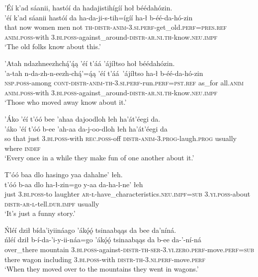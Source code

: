 \newpage
\ea\label{ex:text6-13-21}
’Éí k’ad sáanii, hastóí da hadajistihígíí hoł béédahózin.\\
\gll ’éí	k’ad	sáanii	hastóí	da	ha-da-ji-s-tih=ígíí	ha-ł	b-éé-da-hó-zin\\
     that	now	women	men	not	\textsc{th}-\textsc{distr}-\textsc{anim}-3.\textsc{si}.\textsc{perf}-get\_old.\textsc{perf}=\textsc{pres}.\textsc{ref}	\textsc{anim}.\textsc{poss}-with	3.\textsc{bi}.\textsc{poss}-against\_around-\textsc{distr}-\textsc{ar}.\textsc{ni}.\textsc{th}-know.\textsc{neu}.\textsc{impf}\\
\glt `The old folks know about this.'
\z

\ea\label{ex:text6-13-22}
’Atah ndazhneezhchą́’ą́ą ’éí t’áá ’ájíłtso hoł béédahózin.\\
\gll ’a-tah	n-da-zh-n-eezh-chą́’=ą́ą	’éí	t’áá~{’ájíłtso}	ha-ł	b-éé-da-hó-zin\\
     \textsc{nsp}.\textsc{poss}-among	\textsc{cont}-\textsc{distr}-\textsc{anim}-\textsc{th}-3.\textsc{si}.\textsc{perf}-run.\textsc{perf}=\textsc{pst}.\textsc{ref}	as\_for	all.\textsc{anim}	\textsc{anim}.\textsc{poss}-with	3.\textsc{bi}.\textsc{poss}-against\_around-\textsc{distr}-\textsc{ar}.\textsc{ni}.\textsc{th}-know.\textsc{neu}.\textsc{impf}\\
\glt `Those who moved away know about it.'
\z

\ea\label{ex:text6-13-23}
’Áko ’éí t’óó bee ’ahaa dajoodloh łeh ha’át’éegi da.\\
\gll ’áko	’éí	t’óó	b-ee	’ah-aa	da-j-oo-dloh	łeh	ha’át’éegi	da\\
     so	that	just	3.\textsc{bi}.\textsc{poss}-with	\textsc{rec}.\textsc{poss}-off	\textsc{distr}-\textsc{anim}-3.\textsc{prog}-laugh.\textsc{prog}	usually	where		\textsc{indef}\\
\glt `Every once in a while they make fun of one another about it.'
\z

\ea\label{ex:text6-13-24}
T’óó baa dlo hasingo yaa dahalne’ łeh.\\
\gll t’óó	b-aa	dlo ha-ł-zin=go	y-aa	da-ha-l-ne’	łeh\\
     just	3.\textsc{bi}.\textsc{poss}-to	laughter \textsc{ar}-\textsc{ł}-have\_characteristics.\textsc{neu}.\textsc{impf}=\textsc{sub}	3.\textsc{yi}.\textsc{poss}-about	\textsc{distr}-\textsc{ar}-\textsc{l}-tell.\textsc{dur}.\textsc{impf}	usually\\
\glt `It's just a funny story.'
\z

\ea\label{ex:text6-13-25}
Ńléí dził bída’iyiináago ’ákǫ́ǫ́ tsinaabąąs da bee da’níná.\\
\gll ńléí	dził	b-í-da-’i-y-ii-náa=go	’ákǫ́ǫ́	tsinaabąąs	da	b-ee	da-’-ní-ná\\
     over\_there	mountain	3.\textsc{bi}.\textsc{poss}-against-\textsc{distr}-\textsc{th}-\textsc{ser}-3.\textsc{yi}.\textsc{zero}.\textsc{perf}-move.\textsc{perf}=\textsc{sub}	there	wagon	including	3.\textsc{bi}.\textsc{poss}-with	\textsc{distr}-\textsc{th}-3.\textsc{ni}.\textsc{perf}-move.\textsc{perf}\\
\glt `When they moved over to the mountains they went in wagons.'
\z

